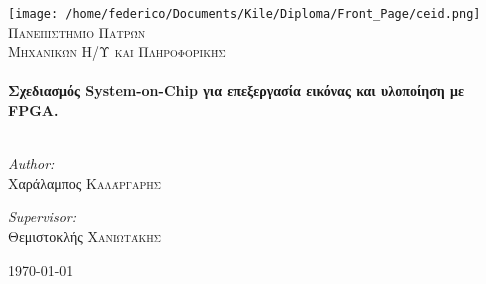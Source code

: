\begin{titlepage}

\begin{center}


\texttt{[image: /home/federico/Documents/Kile/Diploma/Front\_Page/ceid.png]}\\[1cm]    
\textsc{\LARGE Πανεπιστημίο Πατρών}\\[1.5cm]

\textsc{\Large Μηχανικών Η/Υ και Πληροφορικής}\\[2.5cm]


\HRule \\[0.4cm]
{ \Large \bfseries Σχεδιασμός System-on-Chip για επεξεργασία εικόνας και υλοποίηση με FPGA. }\\[0.4cm]

\HRule \\[3.5cm]

\begin{minipage}{0.4\textwidth}
\begin{flushleft} \large
\emph{Author:}\\
Χαράλαμπος \textsc{Καλάργαρης}
\end{flushleft}
\end{minipage}
\begin{minipage}{0.4\textwidth}
\begin{flushright} \large
\emph{Supervisor:} \\
Θεμιστοκλής \textsc{Χανιωτάκης}
\end{flushright}
\end{minipage}

\vfill

{\large \today}

\end{center}

\end{titlepage}